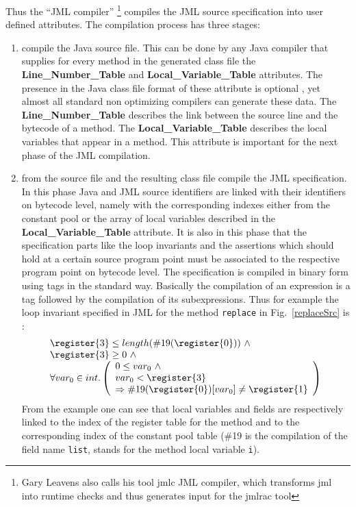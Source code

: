 Thus the ``JML compiler'' \footnote{Gary Leavens also calls his tool jmlc JML compiler, which transforms jml into runtime checks and thus generates input for the jmlrac tool  } compiles the JML source specification into user defined attributes. The compilation process has three stages:
\begin{enumerate}
\item compile the Java source file. This can be done by any Java compiler that supplies for every method in the generated class file the \textbf{Line\_Number\_Table} and \textbf{Local\_Variable\_Table}  attributes. The presence in the Java class file format of these attribute is optional \cite{VMSpec}, yet almost all standard non optimizing compilers can generate these data. The \textbf{Line\_Number\_Table} describes the link between the source line and the bytecode of a method.  The \textbf{Local\_Variable\_Table} describes the local variables that appear in a method. This attribute is important for the next phase of the JML compilation.
\item from the source file and the resulting class file compile the JML specification. In this phase Java and JML source identifiers are linked with their identifiers on bytecode level, namely with the corresponding indexes either from the constant pool or the array of local variables described in the \textbf{Local\_Variable\_Table} attribute. It is also in this phase that the specification parts like the loop invariants and the assertions which should hold at a certain source program point must be associated to the respective program point on bytecode level. The specification
is compiled in binary form using tags in the standard way. Basically the compilation of an expression is a tag followed by the compilation of its subexpressions. 
Thus for example the loop invariant specified in JML for the method \texttt{replace} in Fig.~\ref{replaceSrc} is :
$$
\begin{array}{l}
\register{3} \le length(\#19(\register{0})) \ \wedge \\
\register{3} \ge 0  \ \wedge \\ 
       \forall  var_0 \in int . \left(\begin{array}{l} 0 \le var_0 \ \wedge \\ var_0 < \register{3}  \\
                \Rightarrow  \#19(\register{0})[var_0] \neq \register{1} \end{array} \right)
\end{array}
$$
From the example one can see that local variables and  fields are respectively linked to the index of the register table for the method and to the corresponding index of the constant pool table (\#19 is the compilation of the field name \texttt{list},  stands for the method local variable \texttt{i}). 

\end{enumerate}
